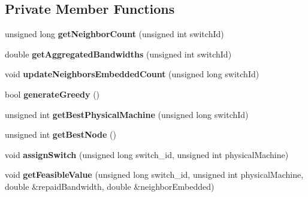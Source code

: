 \subsection*{\-Private \-Member \-Functions}
\begin{DoxyCompactItemize}
\item 
\hypertarget{classGuaranteedEmbedding_ab0ff71ae33735712910327ae69d74203}{unsigned long {\bfseries get\-Neighbor\-Count} (unsigned int switch\-Id)}\label{classGuaranteedEmbedding_ab0ff71ae33735712910327ae69d74203}

\item 
\hypertarget{classGuaranteedEmbedding_a5293c4d7138df6f16a2675d0ab5ef478}{double {\bfseries get\-Aggregated\-Bandwidths} (unsigned int switch\-Id)}\label{classGuaranteedEmbedding_a5293c4d7138df6f16a2675d0ab5ef478}

\item 
\hypertarget{classGuaranteedEmbedding_a4258f5d0a732b80ddca66e235dce7b77}{void {\bfseries update\-Neighbors\-Embedded\-Count} (unsigned long switch\-Id)}\label{classGuaranteedEmbedding_a4258f5d0a732b80ddca66e235dce7b77}

\item 
\hypertarget{classGuaranteedEmbedding_ae47653dc3d5685945b67ab161e72a3f2}{bool {\bfseries generate\-Greedy} ()}\label{classGuaranteedEmbedding_ae47653dc3d5685945b67ab161e72a3f2}

\item 
\hypertarget{classGuaranteedEmbedding_a5f2387e83d05f6319dd3b720e9585f44}{unsigned int {\bfseries get\-Best\-Physical\-Machine} (unsigned long switch\-Id)}\label{classGuaranteedEmbedding_a5f2387e83d05f6319dd3b720e9585f44}

\item 
\hypertarget{classGuaranteedEmbedding_a9f7b0a37afbf64c5b7c4b4d4925a785c}{unsigned int {\bfseries get\-Best\-Node} ()}\label{classGuaranteedEmbedding_a9f7b0a37afbf64c5b7c4b4d4925a785c}

\item 
\hypertarget{classGuaranteedEmbedding_a1d16e59a36e1fc57064c0bcdd692c92b}{void {\bfseries assign\-Switch} (unsigned long switch\-\_\-id, unsigned int physical\-Machine)}\label{classGuaranteedEmbedding_a1d16e59a36e1fc57064c0bcdd692c92b}

\item 
\hypertarget{classGuaranteedEmbedding_afd79890207ce7cd12235768e0f27023f}{void {\bfseries get\-Feasible\-Value} (unsigned long switch\-\_\-id, unsigned int physical\-Machine, double \&repaid\-Bandwidth, double \&neighbor\-Embedded)}\label{classGuaranteedEmbedding_afd79890207ce7cd12235768e0f27023f}


\end{DoxyCompactItemize}
